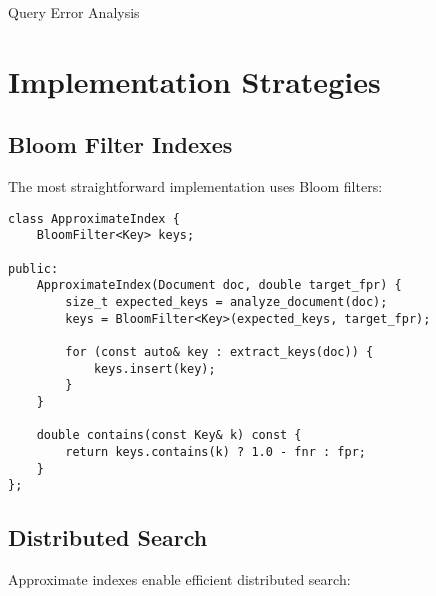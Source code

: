 \documentclass[11pt,final,hidelinks]{article}
\begin{document}
\begin{algorithm}[H]
\SetAlgoLined
{}
\caption{Query Error Analysis}
\end{algorithm}

\section{Implementation Strategies}

\subsection{Bloom Filter Indexes}

The most straightforward implementation uses Bloom filters:

\begin{verbatim}
class ApproximateIndex {
    BloomFilter<Key> keys;
    
public:
    ApproximateIndex(Document doc, double target_fpr) {
        size_t expected_keys = analyze_document(doc);
        keys = BloomFilter<Key>(expected_keys, target_fpr);
        
        for (const auto& key : extract_keys(doc)) {
            keys.insert(key);
        }
    }
    
    double contains(const Key& k) const {
        return keys.contains(k) ? 1.0 - fnr : fpr;
    }
};
\end{verbatim}

\subsection{Distributed Search}

Approximate indexes enable efficient distributed search:
\end{document}

